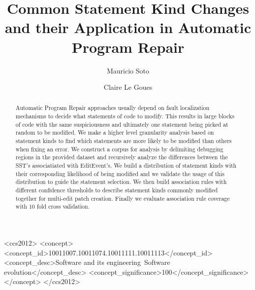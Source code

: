 \documentclass[sigconf]{acmart}
\begin{document}
\title{Common Statement Kind Changes and their Application in Automatic Program Repair}


\author{Mauricio Soto}

\author{Claire Le Goues}




\begin{abstract}
Automatic Program Repair approaches usually depend on fault localization
mechanisms to 
decide what statements of code to modify. This results in 
large blocks of code with the same suspiciousness and 
ultimately one statement being picked at random to be modified.
We make a higher level granularity analysis based on statement kinds
to find which statements are more likely to be modified than others
when fixing an error.
We construct a corpus for analysis by 
delimiting debugging regions in the provided dataset and 
recursively analyze the
differences between the SST's associatiated with EditEvent's. 
We build a distribution of statement kinds with their corresponding
likelihood of being modified and we validate the usage of this 
distribution to guide the statement selection.
We then build association rules with different
confidence thresholds to describe statement kinds commonly modified
together for multi-edit patch creation. Finally
we evaluate association rule coverage with 10 fold cross validation. 


\end{abstract}

%
%
\begin{CCSXML}
<ccs2012>
<concept>
<concept_id>10011007.10011074.10011111.10011113</concept_id>
<concept_desc>Software and its engineering~Software evolution</concept_desc>
<concept_significance>100</concept_significance>
</concept>
</ccs2012>
\end{CCSXML}
\end{document}
